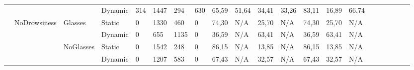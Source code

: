 \documentclass[12pt]{article}
\begin{document}
\begin{landscape}
\begin{table}[]
\begin{adjustbox}{width=1.4\textwidth}
\begin{tabular}{lllllllllllllllccllll}
		\multicolumn{1}{|l|}{} & \multicolumn{1}{l|}{} & \multicolumn{1}{l|}{} & \multicolumn{1}{l|}{Dynamic} & \multicolumn{1}{l|}{314} & \multicolumn{1}{l|}{1447} & \multicolumn{1}{l|}{294} & \multicolumn{1}{l|}{630} & \multicolumn{1}{l|}{65,59} & \multicolumn{1}{l|}{51,64} & \multicolumn{1}{l|}{34,41} & \multicolumn{1}{l|}{33,26} & \multicolumn{1}{l|}{83,11} & \multicolumn{1}{l|}{16,89} & \multicolumn{1}{l|}{66,74} & \multicolumn{1}{c|}{} & \multicolumn{1}{c|}{} & \multicolumn{1}{l|}{} & \multicolumn{1}{l|}{} & \multicolumn{1}{l|}{} & \multicolumn{1}{l|}{} \\ \cline{2-15}
		\multicolumn{1}{|l|}{} & \multicolumn{1}{l|}{\multirow{4}{*}{NoDrowsiness}} & \multicolumn{1}{l|}{\multirow{2}{*}{Glasses}} & \multicolumn{1}{l|}{Static} & \multicolumn{1}{l|}{0} & \multicolumn{1}{l|}{1330} & \multicolumn{1}{l|}{460} & \multicolumn{1}{l|}{0} & \multicolumn{1}{l|}{74,30} & \multicolumn{1}{l|}{N/A} & \multicolumn{1}{l|}{25,70} & \multicolumn{1}{l|}{N/A} & \multicolumn{1}{l|}{74,30} & \multicolumn{1}{l|}{25,70} & \multicolumn{1}{l|}{N/A} & \multicolumn{1}{c|}{} & \multicolumn{1}{c|}{} & \multicolumn{1}{l|}{} & \multicolumn{1}{l|}{} & \multicolumn{1}{l|}{} & \multicolumn{1}{l|}{} \\ \cline{4-15}
		\multicolumn{1}{|l|}{} & \multicolumn{1}{l|}{} & \multicolumn{1}{l|}{} & \multicolumn{1}{l|}{Dynamic} & \multicolumn{1}{l|}{0} & \multicolumn{1}{l|}{655} & \multicolumn{1}{l|}{1135} & \multicolumn{1}{l|}{0} & \multicolumn{1}{l|}{36,59} & \multicolumn{1}{l|}{N/A} & \multicolumn{1}{l|}{63,41} & \multicolumn{1}{l|}{N/A} & \multicolumn{1}{l|}{36,59} & \multicolumn{1}{l|}{63,41} & \multicolumn{1}{l|}{N/A} & \multicolumn{1}{c|}{} & \multicolumn{1}{c|}{} & \multicolumn{1}{l|}{} & \multicolumn{1}{l|}{} & \multicolumn{1}{l|}{} & \multicolumn{1}{l|}{} \\ \cline{3-15}
		\multicolumn{1}{|l|}{} & \multicolumn{1}{l|}{} & \multicolumn{1}{l|}{\multirow{2}{*}{NoGlasses}} & \multicolumn{1}{l|}{Static}  & \multicolumn{1}{l|}{0} & \multicolumn{1}{l|}{1542} & \multicolumn{1}{l|}{248} & \multicolumn{1}{l|}{0} & \multicolumn{1}{l|}{86,15} & \multicolumn{1}{l|}{N/A} & \multicolumn{1}{l|}{13,85} & \multicolumn{1}{l|}{N/A} & \multicolumn{1}{l|}{86,15} & \multicolumn{1}{l|}{13,85} & \multicolumn{1}{l|}{N/A} & \multicolumn{1}{c|}{} & \multicolumn{1}{c|}{} & \multicolumn{1}{l|}{} & \multicolumn{1}{l|}{} & \multicolumn{1}{l|}{} & \multicolumn{1}{l|}{} \\ \cline{4-15}
		\multicolumn{1}{|l|}{} & \multicolumn{1}{l|}{} & \multicolumn{1}{l|}{} & \multicolumn{1}{l|}{Dynamic} & \multicolumn{1}{l|}{0} & \multicolumn{1}{l|}{1207} & \multicolumn{1}{l|}{583} & \multicolumn{1}{l|}{0} & \multicolumn{1}{l|}{67,43} & \multicolumn{1}{l|}{N/A} & \multicolumn{1}{l|}{32,57} & \multicolumn{1}{l|}{N/A} & \multicolumn{1}{l|}{67,43} & \multicolumn{1}{l|}{32,57} & \multicolumn{1}{l|}{N/A} & \multicolumn{1}{c|}{} & \multicolumn{1}{c|}{} & \multicolumn{1}{l|}{} & \multicolumn{1}{l|}{} & \multicolumn{1}{l|}{} & \multicolumn{1}{l|}{} \\ \hline

\end{tabular}
\end{adjustbox}
\end{table}
\end{landscape}
\end{document}
